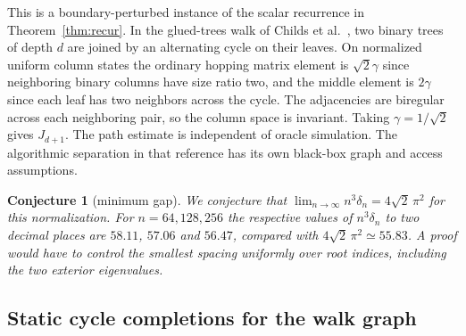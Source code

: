 \documentclass[11pt,reqno]{amsart}
\newtheorem{conjecture}[theorem]{Conjecture}
\theoremstyle{definition}
\theoremstyle{remark}
\numberwithin{equation}{section}
\begin{document}
This is a boundary-perturbed instance of the scalar recurrence in Theorem~\ref{thm:recur}. In the glued-trees walk of Childs et al.\ \cite[\S III.D, Lemmas 1--2 and Eqs.~(25)--(27), (42)--(49), arXiv v2]{m4:Childs}, two binary trees of depth $d$ are joined by an alternating cycle on their leaves. On normalized uniform column states the ordinary hopping matrix element is $\sqrt2\gamma$ since neighboring binary columns have size ratio two, and the middle element is $2\gamma$ since each leaf has two neighbors across the cycle. The adjacencies are biregular across each neighboring pair, so the column space is invariant. Taking $\gamma=1/\sqrt2$ gives $J_{d+1}$. The path estimate is independent of oracle simulation. The algorithmic separation in that reference has its own black-box graph and access assumptions.

\begin{conjecture}[minimum gap]\label{m4:gap-limit}
We conjecture that $\lim_{n\to\infty}n^3\delta_n=4\sqrt2\,\pi^2$ for this normalization. For $n=64,128,256$ the respective values of $n^3\delta_n$ to two decimal places are $58.11$, $57.06$ and $56.47$, compared with $4\sqrt2\,\pi^2\simeq55.83$. A proof would have to control the smallest spacing uniformly over root indices, including the two exterior eigenvalues.
\end{conjecture}

\subsection{Static cycle completions for the walk graph}
\end{document}
